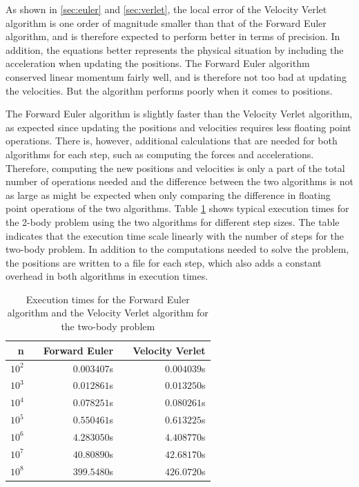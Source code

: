 \documentclass{article}
\begin{document}
As shown in \ref{sec:euler} and \ref{sec:verlet}, the local error of the Velocity Verlet algorithm is one order of magnitude smaller than that of the Forward Euler algorithm, and is therefore expected to perform better in terms of precision. In addition, the equations better represents the physical situation by including the acceleration when updating the positions. The Forward Euler algorithm conserved linear momentum fairly well, and is therefore not too bad at updating the velocities. But the algorithm performs poorly when it comes to positions.

The Forward Euler algorithm is slightly faster than the Velocity Verlet algorithm, as expected since updating the positions and velocities requires less floating point operations. There is, however, additional calculations that are needed for both algorithms for each step, such as computing the forces and accelerations. Therefore, computing the new positions and velocities is only a part of the total number of operations needed and the difference between the two algorithms is not as large as might be expected when only comparing the difference in floating point operations of the two algorithms. Table \ref{tab:exec} shows typical execution times for the 2-body problem using the two algorithms for different step sizes. The table indicates that the execution time scale linearly with the number of steps for the two-body problem.  In addition to the computations needed to solve the problem, the positions are written to a file for each step, which also adds a constant overhead in both algorithms in execution times. 

\begin{table}[h]
\centering
\caption{Execution times for the Forward Euler algorithm and the Velocity Verlet algorithm for the two-body problem}
\label{tab:exec}
\begin{tabularx}{\textwidth}{r X r X r }
\hline
n && Forward Euler && Velocity Verlet \\
\hline\hline
$10^2$ && $0.003407$s && $0.004039$s \\
$10^3$ && $0.012861$s && $0.013250$s \\
$10^4$ && $0.078251$s && $0.080261$s \\
$10^5$ && $0.550461$s && $0.613225$s \\
$10^6$ && $4.283050$s && $4.408770$s \\
$10^7$ && $40.80890$s && $42.68170$s \\
$10^8$ && $399.5480$s && $426.0720$s \\
\hline
\end{tabularx}
\end{table}
\end{document}
